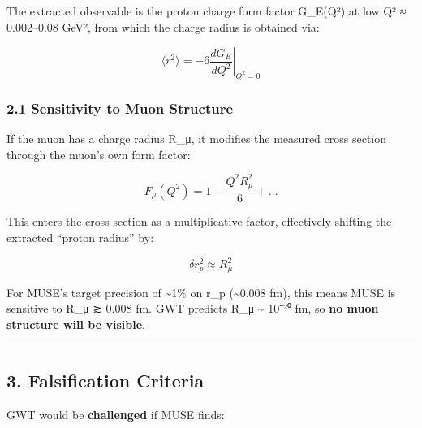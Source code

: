 \documentclass[
]{article}
\begin{document}
The extracted observable is the proton charge form factor G\_E(Q²) at
low Q² ≈ 0.002--0.08 GeV², from which the charge radius is obtained via:

\[\langle r^2 \rangle = -6 \left.\frac{dG_E}{dQ^2}\right|_{Q^2=0}\]

\subsubsection{2.1 Sensitivity to Muon
Structure}\label{sensitivity-to-muon-structure}

If the muon has a charge radius R\_μ, it modifies the measured cross
section through the muon's own form factor:

\[F_\mu(Q^2) = 1 - \frac{Q^2 R_\mu^2}{6} + \ldots\]

This enters the cross section as a multiplicative factor, effectively
shifting the extracted ``proton radius'' by:

\[\delta r_p^2 \approx R_\mu^2\]

For MUSE's target precision of \textasciitilde1\% on r\_p
(\textasciitilde0.008 fm), this means MUSE is sensitive to R\_μ ≳ 0.008
fm. GWT predicts R\_μ \textasciitilde{} 10⁻²⁰ fm, so \textbf{no muon
structure will be visible}.

\begin{center}\rule{0.5\linewidth}{0.5pt}\end{center}

\subsection{3. Falsification Criteria}\label{falsification-criteria}

GWT would be \textbf{challenged} if MUSE finds:
\end{document}
